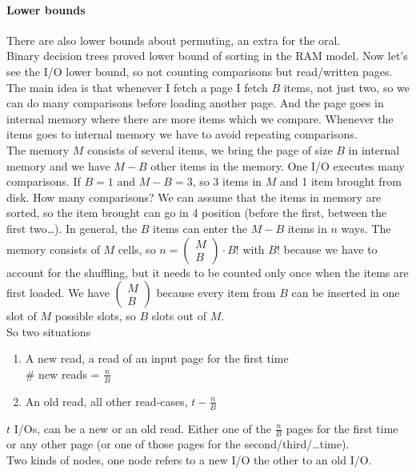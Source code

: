 \documentclass[10pt]{report}
\begin{document}
\paragraph{Lower bounds} There are also lower bounds about permuting, an extra for the oral.\\
Binary decision trees proved lower bound of sorting in the RAM model. Now let's see the I/O lower bound, so not counting comparisons but read/written pages. The main idea is that whenever I fetch a page I fetch $B$ items, not just two, so we can do many comparisons before loading another page. And the page goes in internal memory where there are more items which we compare. Whenever the items goes to internal memory we have to avoid repeating comparisons.\\
The memory $M$ consists of several items, we bring the page of size $B$ in internal memory and we have $M-B$ other items in the memory. One I/O executes many comparisons. If $B = 1$ and $M - B = 3$, so 3 items in $M$ and 1 item brought from disk. How many comparisons? We can assume that the items in memory are sorted, so the item brought can go in 4 position (before the first, between the first two\ldots). In general, the $B$ items can enter the $M-B$ items in $n$ ways. The memory consists of $M$ cells, so $n = \left(\begin{array}{c}
M\\B
\end{array}\right)\cdot B!$ with $B!$ because we have to account for the shuffling, but it needs to be counted only once when the items are first loaded. We have $\left(\begin{array}{c}
M\\B
\end{array}\right)$ because every item from $B$ can be inserted in one slot of $M$ possible slots, so $B$ slots out of $M$.\\
So two situations \begin{enumerate}
	\item A new read, a read of an input page for the first time\\
	\# new reads = $\frac{n}{B}$
	\item An old read, all other read-cases, $t - \frac{n}{B}$
\end{enumerate}
$t$ I/Os, can be a new or an old read. Either one of the $\frac{n}{B}$ pages for the first time or any other page (or one of those pages for the second/third/\ldots time).\\
Two kinds of nodes, one node refers to a new I/O the other to an old I/O.\\
\end{document}
